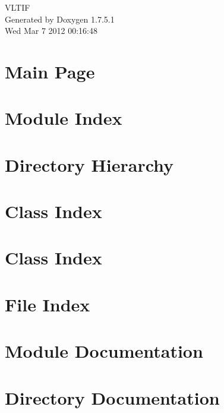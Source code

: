 \documentclass[a4paper]{book}
\begin{document}
\hypersetup{pageanchor=false,citecolor=blue}
\begin{titlepage}
\vspace*{7cm}
\begin{center}
{\Large \-V\-L\-T\-I\-F }\\
\vspace*{1cm}
{\large \-Generated by Doxygen 1.7.5.1}\\
\vspace*{0.5cm}
{\small Wed Mar 7 2012 00:16:48}\\
\end{center}
\end{titlepage}
\clearemptydoublepage
{}
\tableofcontents
\clearemptydoublepage
{}
\hypersetup{pageanchor=true,citecolor=blue}
\chapter{\-Main \-Page}
\label{index}\hypertarget{index}{}
\chapter{\-Module \-Index}

\chapter{\-Directory \-Hierarchy}

\chapter{\-Class \-Index}

\chapter{\-Class \-Index}

\chapter{\-File \-Index}

\chapter{\-Module \-Documentation}




\chapter{\-Directory \-Documentation}





\end{document}
